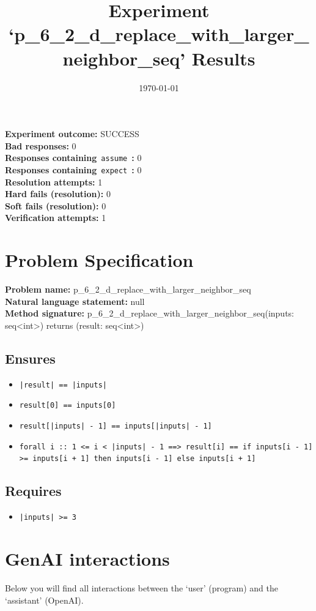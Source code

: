 \documentclass{article}
\begin{document}
\title{Experiment `p\_6\_2\_d\_replace\_with\_larger\_neighbor\_seq' Results}
\author{\today}
\date{}
\maketitle
\textbf{Experiment outcome: }SUCCESS
\\\textbf{Bad responses: }0
\\\textbf{Responses containing}~\texttt{assume}~\textbf{: }0
\\\textbf{Responses containing}~\texttt{expect}~\textbf{: }0
\\\textbf{Resolution attempts: }1
\\\textbf{Hard fails (resolution): }0
\\\textbf{Soft fails (resolution): }0
\\\textbf{Verification attempts: }1
\section*{Problem Specification}
\textbf{Problem name: }p\_6\_2\_d\_replace\_with\_larger\_neighbor\_seq
\\\textbf{Natural language statement: }null
\\\textbf{Method signature: }p\_6\_2\_d\_replace\_with\_larger\_neighbor\_seq(inputs: seq<int>) returns (result: seq<int>)
\subsection*{Ensures}
\begin{itemize}
\item \texttt{|result| == |inputs|}
\item \texttt{result[0] == inputs[0]}
\item \texttt{result[|inputs| - 1] == inputs[|inputs| - 1]}
\item \texttt{forall i :: 1 <= i < |inputs| - 1 ==> result[i] == if inputs[i - 1] >= inputs[i + 1] then inputs[i - 1] else inputs[i + 1]}
\end{itemize}
\subsection*{Requires}
\begin{itemize}
\item \texttt{|inputs| >= 3}
\end{itemize}
\clearpage
\section*{GenAI interactions}
Below you will find all interactions between the `user' (program) and the `assistant' (OpenAI).
\end{document}
